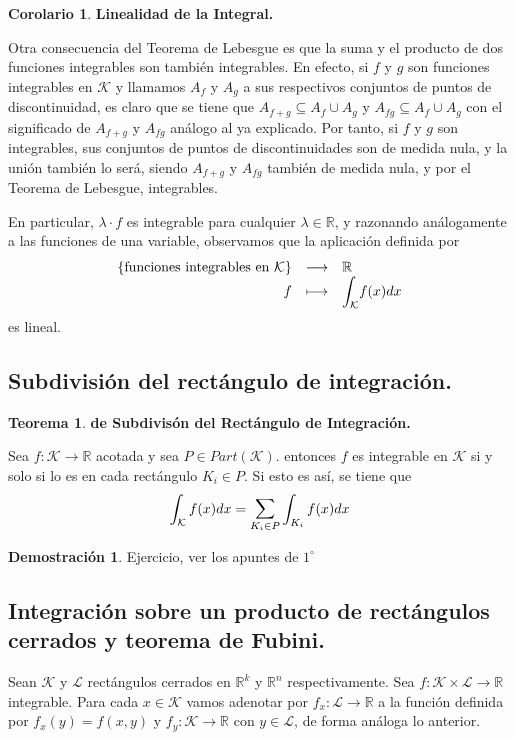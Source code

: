 \documentclass[12pt,twoside]{report}
\newcommand\mc[1]{\mathcal{#1}}
\theoremstyle{azul}
\theoremstyle{azul2}
\theoremstyle{plain}
\theoremstyle{definition}
\newtheorem*{dem}{Demostración}
\newtheorem{teo}{Teorema}[chapter]
\newtheorem*{cor}{Corolario}
\theoremstyle{remark}
\begin{document}
\begin{cor}\textbf{Linealidad de la Integral.}

Otra consecuencia del Teorema de Lebesgue es que la suma y el producto de dos funciones integrables son también integrables. En efecto, si $f$ y $g$ son funciones integrables en $\mc{K}$ y llamamos $A_f$ y $A_g$ a sus respectivos conjuntos de puntos de discontinuidad, es claro que se tiene que $A_{f+g} \subseteq A_f \cup A_g$ y $A_{fg} \subseteq A_f \cup A_g$ con el significado de $A_{f+g}$ y $A_{fg}$ análogo al ya explicado. Por tanto, si $f$ y $g$ son integrables, sus conjuntos de puntos de discontinuidades son de medida nula, y la unión también lo será, siendo $A_{f+g}$ y $A_{fg}$ también de medida nula, y por el Teorema de Lebesgue, integrables. 

En particular, $\lambda \cdot f$ es integrable para cualquier $\lambda \in \mathbb{R}$, y razonando análogamente a las funciones de una variable, observamos que la aplicación definida por $$
\begin{array}{rcl}
     \{\text{funciones integrables en }\mc{K}\} & \longrightarrow & \mathbb{R}  \\
      f & \longmapsto & \mathlarger{\int}_{\mc{K}} f(x) dx 
\end{array}$$ es lineal.
\end{cor}
\subsection{Subdivisión del rectángulo de integración.}
\begin{teo} \textbf{de Subdivisón del Rectángulo de Integración.} 

Sea $f: \mc{K} \longrightarrow \mathbb{R}$ acotada y sea $P \in Part(\mc{K})$. entonces $f$ es integrable en $\mc{K}$ si y solo si lo es en cada rectángulo $K_i \in P$. Si esto es así, se tiene que $$\int_{\mc{K}} f(x) dx = \mathlarger{\sum}_{K_i \in P }\int_{{K_i}} f(x) dx$$
\begin{dem}
Ejercicio, ver los apuntes de $1^{\circ}$
\end{dem}
\end{teo}
\subsection{Integración sobre un producto de rectángulos cerrados y teorema de Fubini.}
Sean $\mc{K}$ y $\mc{L}$ rectángulos cerrados en $\mathbb{R}^k$ y $\mathbb{R}^n$ respectivamente. Sea $f: \mc{K} \times \mc{L} \longrightarrow \mathbb{R}$ integrable. Para cada $x \in \mc{K}$ vamos adenotar por $f_x: \mc{L} \longrightarrow \mathbb{R}$ a la función definida por $f_x(y)=f(x,y)$ y $f_y: \mc{K} \longrightarrow \mathbb{R}$ con $y \in \mc{L}$, de forma análoga lo anterior. 
\end{document}
